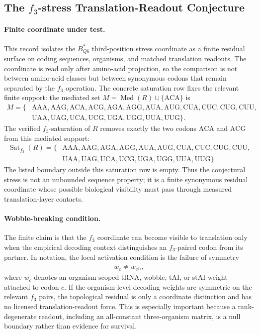 \subsection{The $f_3$-stress Translation-Readout Conjecture}
\label{sec:q6-f3-stress-wobble-broken-translation-readout-cross-layer}

\paragraph{Finite coordinate under test.}
This record isolates the $B^{*}_{Q6}$ third-position stress coordinate as a finite residual surface on coding sequences, organisms, and matched translation readouts.  The coordinate is read only after amino-acid projection, so the comparison is not between amino-acid classes but between synonymous codons that remain separated by the $f_3$ operation.  The concrete saturation row fixes the relevant finite support: the mediated set $M = \operatorname{Med}(R) \cup \{\mathrm{ACA}\}$ is
$$
\begin{aligned}
M=\{&\mathrm{AAA},\mathrm{AAG},\mathrm{ACA},\mathrm{ACG},\mathrm{AGA},\mathrm{AGG},\mathrm{AUA},\mathrm{AUG},\mathrm{CUA},\mathrm{CUC},\mathrm{CUG},\mathrm{CUU},\\
&\mathrm{UAA},\mathrm{UAG},\mathrm{UCA},\mathrm{UCG},\mathrm{UGA},\mathrm{UGG},\mathrm{UUA},\mathrm{UUG}\}.
\end{aligned}
$$
The verified $f_3$-saturation of $R$ removes exactly the two codons $\mathrm{ACA}$ and $\mathrm{ACG}$ from this mediated support:
$$
\begin{aligned}
\operatorname{Sat}_{f_3}(R)=\{&\mathrm{AAA},\mathrm{AAG},\mathrm{AGA},\mathrm{AGG},\mathrm{AUA},\mathrm{AUG},\mathrm{CUA},\mathrm{CUC},\mathrm{CUG},\mathrm{CUU},\\
&\mathrm{UAA},\mathrm{UAG},\mathrm{UCA},\mathrm{UCG},\mathrm{UGA},\mathrm{UGG},\mathrm{UUA},\mathrm{UUG}\}.
\end{aligned}
$$
The listed boundary outside this saturation row is empty.  Thus the conjectural stress is not an unbounded sequence property; it is a finite synonymous residual coordinate whose possible biological visibility must pass through measured translation-layer contacts.

\paragraph{Wobble-breaking condition.}
The finite claim is that the $f_3$ coordinate can become visible to translation only when the empirical decoding context distinguishes an $f_3$-paired codon from its partner.  In notation, the local activation condition is the failure of symmetry
$$
\begin{aligned}
w_c \neq w_{c^{f_3}},
\end{aligned}
$$
where $w_c$ denotes an organism-scoped tRNA, wobble, tAI, or stAI weight attached to codon $c$.  If the organism-level decoding weights are symmetric on the relevant $f_3$ pairs, the topological residual is only a coordinate distinction and has no licensed translation-readout force.  This is especially important because a rank-degenerate readout, including an all-constant three-organism matrix, is a null boundary rather than evidence for survival.

